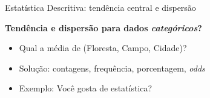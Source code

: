 \documentclass{beamer}\usepackage[]{graphicx}\usepackage[]{color}
\begin{document}
\begin{frame}{Estatística Descritiva: tendência central e dispersão}
\linespread{1.5} 
 
\textbf{Tendência e dispersão para dados \emph{categóricos}?}

\begin{small}
\begin{itemize}
  \item Qual a média de (Floresta, Campo, Cidade)? \pause
  \item Solução: contagens, frequência, porcentagem, \emph{odds}\pause
  \item Exemplo: Você gosta de estatística?
\end{itemize}
\end{small}

\begin{columns}[c]

\end{columns}
\end{frame} 
\end{document}
